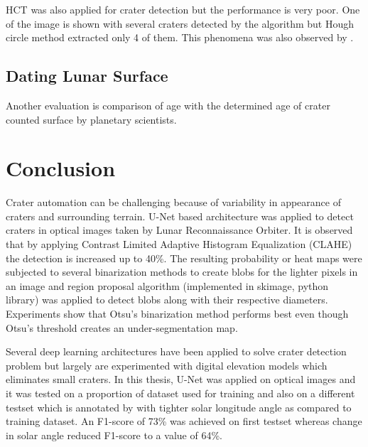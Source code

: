 \documentclass[11pt]{article}
\begin{document}
HCT was also applied for crater detection but the performance is very poor. One of the image is shown with several craters detected by the algorithm but Hough circle method extracted only 4 of them. This phenomena was also observed by \cite{wetzler2005learning}.
%

\subsection{Dating Lunar Surface}
Another evaluation is comparison of age with the determined age of crater counted surface by planetary scientists.

\section{Conclusion}
Crater automation can be challenging because of variability in appearance of craters and surrounding terrain. U-Net based architecture was applied to detect craters in optical images taken by Lunar Reconnaissance Orbiter. It is observed that by applying Contrast Limited Adaptive Histogram Equalization (CLAHE) the detection is increased up to 40\%. The resulting probability or heat maps were subjected to several binarization methods to create blobs for the lighter pixels in an image and region proposal algorithm (implemented in skimage, python library) was applied to detect blobs along with their respective diameters. Experiments show that Otsu's binarization method performs best even though Otsu's threshold creates an under-segmentation map. 

Several deep learning architectures have been applied to solve crater detection problem but largely are experimented with digital elevation models which eliminates small craters. In this thesis, U-Net was applied on optical images and it was tested on a proportion of dataset used for training and also on a different testset which is annotated by \cite{dino2020} with tighter solar longitude angle as compared to training dataset. An F1-score of 73\% was achieved on first testset whereas change in solar angle reduced F1-score to a value of 64\%.

\end{document}
